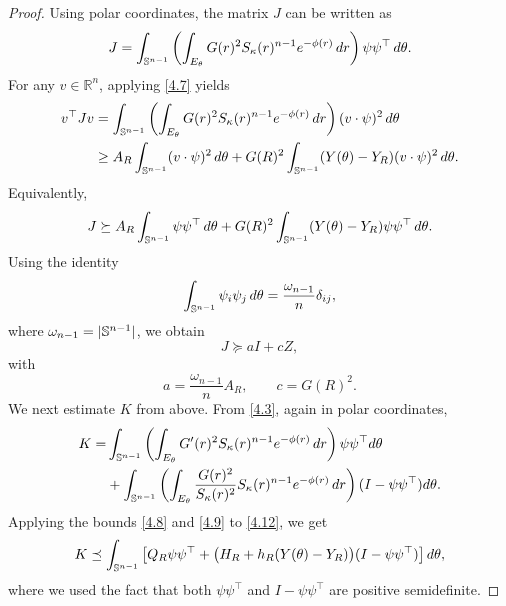 \documentclass[11pt,leqno]{amsart}
\def\k{\kappa}
\def\S{\Bbb S}
\def\Sph{\Bbb S}
\def\k{\kappa}
\numberwithin{equation}{section}
\begin{document}
\begin{proof}
 Using polar coordinates,  the matrix  $J$ can be written as
\begin{align*}
J=\int_{\S^{n-1}}\left(\int_{E_\theta}G(r)^2S_{\k}(r)^{n-1}e^{-\phi(r)}\,dr\right)\psi\psi^\top\,d\theta.
\end{align*}
 For any  $v\in\mathbb R^n$, applying  \eqref{4.7} yields
\begin{align*}
\begin{aligned}
v^\top  Jv
        &=
        \int_{\Sph^{n-1}}
        \left(
        \int_{E_\theta}G(r)^2S_{\k}(r)^{n-1}e^{-\phi(r)}\,dr
        \right)
        (v\cdot\psi)^2\,d\theta \\
        &\geq
        A_R\int_{\Sph^{n-1}}(v\cdot\psi)^2\,d\theta
        +
        G(R)^2
        \int_{\Sph^{n-1}}(Y(\theta)-Y_R)(v\cdot\psi)^2\,d\theta.
\end{aligned}
\end{align*}
Equivalently,
\begin{align*}
        J\succeq
        A_R\int_{\Sph^{n-1}}\psi\psi^\top \,d\theta
        +
        G(R)^2
        \int_{\Sph^{n-1}}(Y(\theta)-Y_R)\psi\psi^\top \,d\theta .
\end{align*}
Using the identity
\begin{align}\label{4.10}
    \int_{\S^{n-1}} \psi_i\psi_j\, d\theta=\frac{\omega_{n-1}}{n} \delta_{ij},
\end{align}
where $\omega_{n-1}=|\S^{n-1}|$, we obtain
\begin{equation}\label{4.11}
        J\succeq aI+cZ,
\end{equation}
with 
$$a=\frac{\omega_{n-1}}{n} A_R, \qquad c=G(R)^2.$$ 
We next estimate $K$ from above. From \eqref{4.3}, again in
polar coordinates,
\begin{align}\label{4.12}
K=&
\int_{\S^{n-1}} \left(\int_{E_\theta}G'(r)^2S_{\k}(r)^{n-1}e^{-\phi(r)}\,dr\right)\psi\psi^\top d\theta\nonumber\\
    &+\int_{\S^{n-1}} \left(\int_{E_\theta}\frac{G(r)^2}{S_{\k}(r)^2}S_{\k}(r)^{n-1}e^{-\phi(r  )}\,dr\right) (I-\psi\psi^\top )
       d\theta.
\end{align}
Applying the bounds \eqref{4.8} and
\eqref{4.9} to \eqref{4.12}, we get
\begin{align*}
K
\preceq
\int_{\Sph^{n-1}}
        \left[
        Q_R\psi\psi^\top
        +
        \bigl(H_R+h_R(Y(\theta)-Y_R)\bigr)(I-\psi\psi^\top )
        \right]d\theta,
\end{align*}
where we used the fact that both $\psi\psi^\top$ and  $I- \psi\psi^\top$ are
positive semidefinite.

\end{proof}
\end{document}
